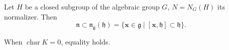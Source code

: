 Let $H$ be a closed subgroup of the algebraic group $G$, $N = N_G(H)$ its normalizer. Then
$$\mathfrak{n} \subset \mathfrak{n}_\mathfrak{g}(\mathfrak{h}) = \{\mathbf{x} \in \mathfrak{g} \mid [\mathbf{x}, \mathfrak{h}] \subset \mathfrak{h}\}.$$

When $\operatorname{char} K = 0$, equality holds.
